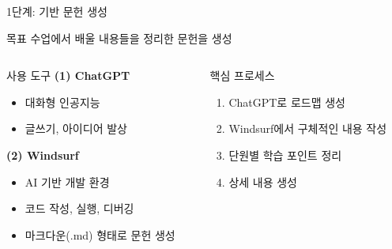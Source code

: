 \documentclass[aspectratio=169,xcolor=dvipsnames]{beamer}
\begin{document}
\begin{frame}{1단계: 기반 문헌 생성}
  \begin{block}{목표}
    수업에서 배울 내용들을 정리한 문헌을 생성
  \end{block}

  \vspace{0.5cm}

  \begin{columns}[t]
    \begin{column}{0.48\textwidth}
      \begin{exampleblock}{사용 도구}
        \textbf{(1) ChatGPT}
        \begin{itemize}
          \item 대화형 인공지능
          \item 글쓰기, 아이디어 발상
        \end{itemize}

        \vspace{0.3cm}

        \textbf{(2) Windsurf}
        \begin{itemize}
          \item AI 기반 개발 환경
          \item 코드 작성, 실행, 디버깅
          \item 마크다운(.md) 형태로 문헌 생성
        \end{itemize}
      \end{exampleblock}
    \end{column}

    \begin{column}{0.48\textwidth}
      \begin{alertblock}{핵심 프로세스}
        \begin{enumerate}
          \item ChatGPT로 로드맵 생성
          \item Windsurf에서 구체적인 내용 작성
          \item 단원별 학습 포인트 정리
          \item 상세 내용 생성
        \end{enumerate}
      \end{alertblock}
    \end{column}
  \end{columns}
\end{frame}
\end{document}
